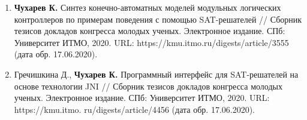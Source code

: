 \begin{enumerate}[left=0pt]
    \item \textbf{Чухарев К.} Синтез конечно-автоматных моделей модульных логических контроллеров по примерам поведения с помощью SAT-решателей // Сборник тезисов докладов конгресса молодых ученых. Электронное издание. СПб: Университет ИТМО, 2020. URL: https://kmu.itmo.ru/digests/article/3555 (дата обр. 17.06.2020).
    \item Гречишкина Д., \textbf{Чухарев К.} Программный интерфейс для SAT-решателей на основе технологии JNI // Сборник тезисов докладов конгресса молодых ученых. Электронное издание. СПб: Университет ИТМО, 2020. URL: https://kmu.itmo. ru/digests/article/4456 (дата обр. 17.06.2020).
\end{enumerate}

